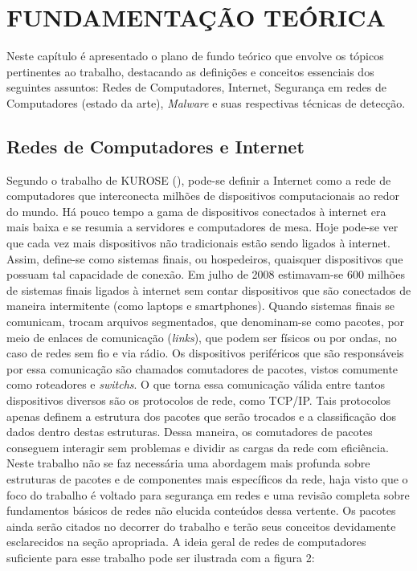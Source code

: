 
\chapter{FUNDAMENTAÇÃO TEÓRICA}
\label{c.fundamentacao}

Neste capítulo é apresentado o plano de fundo teórico que envolve os tópicos
pertinentes ao trabalho, destacando as definições e conceitos essenciais dos
seguintes assuntos: Redes de Computadores, Internet, Segurança em redes de
Computadores (estado da arte), \textit{Malware} e suas respectivas técnicas de
detecção.
\section{Redes de Computadores e Internet}
\label{s.teoria_redes_internet}

Segundo o trabalho de KUROSE (\citeyear{kurose09}), pode-se definir a Internet
como a rede de computadores que interconecta milhões de dispositivos
computacionais ao redor do mundo. Há pouco tempo a gama de dispositivos
conectados à internet era mais baixa e se resumia a servidores e computadores
de mesa. Hoje pode-se ver que cada vez mais dispositivos não tradicionais
estão sendo ligados à internet. Assim, define-se como sistemas finais, ou
hospedeiros, quaisquer dispositivos que possuam tal capacidade de conexão. Em
julho de 2008 estimavam-se 600 milhões de sistemas finais ligados à internet
sem contar dispositivos que são conectados de maneira intermitente (como
laptops e smartphones). Quando sistemas finais se comunicam, trocam arquivos
segmentados, que denominam-se como pacotes, por meio de enlaces de comunicação
(\textit{links}), que podem ser físicos ou por ondas, no caso de redes sem fio e via
rádio. Os dispositivos periféricos que são responsáveis por essa comunicação
são chamados comutadores de pacotes, vistos comumente como roteadores e
\textit{switchs}. O que torna essa comunicação válida entre tantos dispositivos
diversos são os protocolos de rede, como TCP/IP. Tais protocolos apenas
definem a estrutura dos pacotes que serão trocados e a classificação dos dados
dentro destas estruturas. Dessa maneira, os comutadores de pacotes conseguem
interagir sem problemas e dividir as cargas da rede com eficiência. Neste
trabalho não se faz necessária uma abordagem mais profunda sobre estruturas de
pacotes e de componentes mais específicos da rede, haja visto que o foco do
trabalho é voltado para segurança em redes e uma revisão completa sobre
fundamentos básicos de redes não elucida conteúdos dessa vertente. Os pacotes
ainda serão citados no decorrer do trabalho e terão seus conceitos devidamente
esclarecidos na seção apropriada. A ideia geral de redes de computadores
suficiente para esse trabalho pode ser ilustrada com a figura 2:

